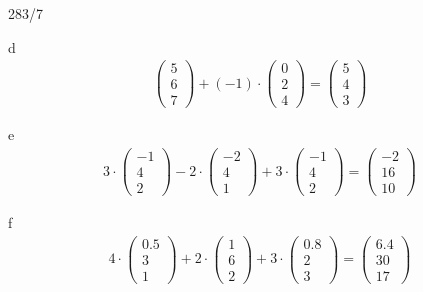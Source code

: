 \begin{exercise}{283/7}
  \item [d]
  \begin{gather*}
    \begin{pmatrix}5 \\ 6 \\ 7\end{pmatrix} + (-1) \cdot \begin{pmatrix}0 \\ 2 \\ 4\end{pmatrix} = \begin{pmatrix}5 \\ 4 \\ 3\end{pmatrix}
  \end{gather*}
  \item [e]
  \begin{gather*}
    3 \cdot \begin{pmatrix}-1 \\ 4 \\ 2\end{pmatrix} - 2 \cdot \begin{pmatrix}-2 \\ 4 \\ 1\end{pmatrix} + 3 \cdot \begin{pmatrix}-1 \\ 4 \\ 2\end{pmatrix} = \begin{pmatrix}-2 \\ 16 \\ 10\end{pmatrix}
  \end{gather*}
  \item [f]
  \begin{gather*}
    4 \cdot \begin{pmatrix}0.5 \\ 3 \\ 1\end{pmatrix} + 2 \cdot \begin{pmatrix}1 \\ 6 \\ 2\end{pmatrix} + 3 \cdot \begin{pmatrix}0.8 \\ 2 \\ 3\end{pmatrix} = \begin{pmatrix}6.4 \\ 30 \\ 17\end{pmatrix}
  \end{gather*}
\end{exercise}
